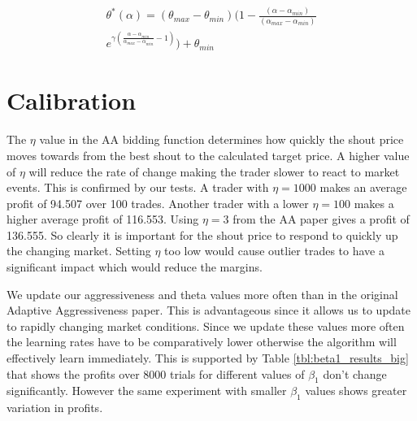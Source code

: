\documentclass[preprint]{acm_proc_article-sp} %
\begin{document}
\begin{equation}
  \begin{split}
    \label{eqn:theta_star}
    \theta^*(\alpha) = (\theta_{max}-\theta_{min})
    (1-\frac{(\alpha-\alpha_{min})}{(\alpha_{max} -\alpha_{min})} \\
    e^{\gamma(\frac{\alpha-\alpha_{min}}{\alpha_{max}-\alpha_{min}}-1)})
    + \theta_{min}
  \end{split}
\end{equation}

\section{Calibration} \label{sec:calibration}
The $\eta$ value in the AA bidding function determines how quickly the shout
price moves towards from the best shout to the calculated target price. A
higher value of $\eta$ will reduce the rate of change making the trader slower
to react to market events. This is confirmed by our tests. A trader with $\eta
= 1000$ makes an average profit of 94.507 over 100 trades. Another trader with
a lower $\eta = 100$ makes a higher average profit of 116.553. Using $\eta = 3$
from the AA paper gives a profit of 136.555. So clearly it is important for the
shout price to respond to quickly up the changing market. Setting $\eta$ too
low would cause outlier trades to have a significant impact which would reduce
the margins.

We update our aggressiveness and theta values more often than in the original Adaptive Aggressiveness 
paper\cite{AA_thesis}. This is advantageous since it allows us to update to rapidly changing market 
conditions. Since we update these values more often the learning rates have to be comparatively lower 
otherwise the algorithm will effectively learn immediately. This is supported by Table \ref{tbl:beta1_results_big} that shows 
the profits over 8000 trials for different values of $\beta_1$ don't change significantly. However 
the same experiment with smaller $\beta_1$ values shows greater variation in profits.
\end{document}
